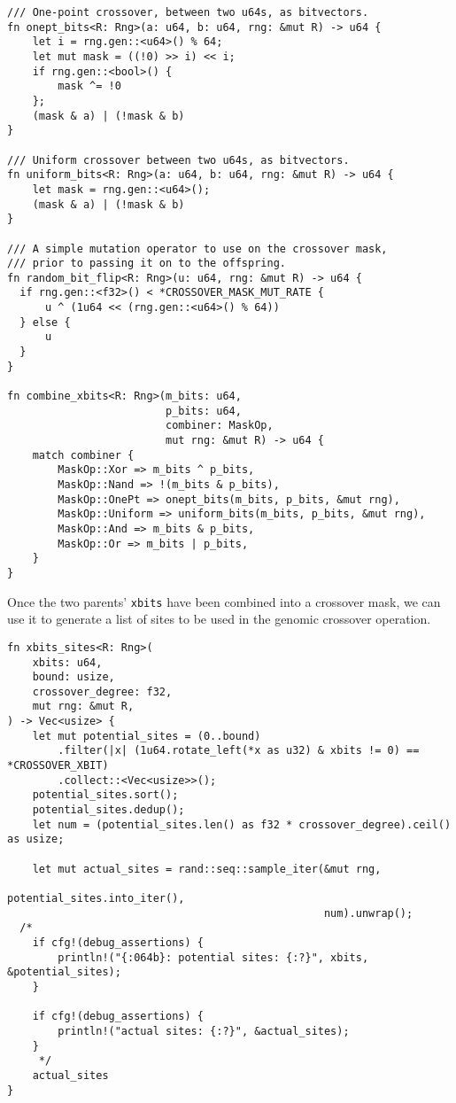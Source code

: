 \documentclass[11pt]{article}
\begin{document}
\lstset{language=rust,label=org20ba1f2,caption= ,captionpos=b,numbers=none}
\begin{lstlisting}
/// One-point crossover, between two u64s, as bitvectors.
fn onept_bits<R: Rng>(a: u64, b: u64, rng: &mut R) -> u64 {
    let i = rng.gen::<u64>() % 64;
    let mut mask = ((!0) >> i) << i;
    if rng.gen::<bool>() {
        mask ^= !0
    };
    (mask & a) | (!mask & b)
}

/// Uniform crossover between two u64s, as bitvectors.
fn uniform_bits<R: Rng>(a: u64, b: u64, rng: &mut R) -> u64 {
    let mask = rng.gen::<u64>();
    (mask & a) | (!mask & b)
}

/// A simple mutation operator to use on the crossover mask,
/// prior to passing it on to the offspring.
fn random_bit_flip<R: Rng>(u: u64, rng: &mut R) -> u64 {
  if rng.gen::<f32>() < *CROSSOVER_MASK_MUT_RATE {
      u ^ (1u64 << (rng.gen::<u64>() % 64)) 
  } else {
      u
  }
}

fn combine_xbits<R: Rng>(m_bits: u64,
                         p_bits: u64,
                         combiner: MaskOp,
                         mut rng: &mut R) -> u64 {
    match combiner {
        MaskOp::Xor => m_bits ^ p_bits,
        MaskOp::Nand => !(m_bits & p_bits),
        MaskOp::OnePt => onept_bits(m_bits, p_bits, &mut rng),
        MaskOp::Uniform => uniform_bits(m_bits, p_bits, &mut rng),
        MaskOp::And => m_bits & p_bits,
        MaskOp::Or => m_bits | p_bits,
    }
}
\end{lstlisting}

Once the two parents' \texttt{xbits} have been combined into a crossover mask, we
can use it to generate a list of sites to be used in the genomic crossover
operation. 

\lstset{language=rust,label=org42d00c5,caption= ,captionpos=b,numbers=none}
\begin{lstlisting}
fn xbits_sites<R: Rng>(
    xbits: u64,
    bound: usize,
    crossover_degree: f32,
    mut rng: &mut R,
) -> Vec<usize> {
    let mut potential_sites = (0..bound)
        .filter(|x| (1u64.rotate_left(*x as u32) & xbits != 0) == *CROSSOVER_XBIT)
        .collect::<Vec<usize>>();
    potential_sites.sort();
    potential_sites.dedup();
    let num = (potential_sites.len() as f32 * crossover_degree).ceil() as usize;

    let mut actual_sites = rand::seq::sample_iter(&mut rng,
                                                  potential_sites.into_iter(), 
                                                  num).unwrap();
  /*
    if cfg!(debug_assertions) {
        println!("{:064b}: potential sites: {:?}", xbits, &potential_sites);
    }

    if cfg!(debug_assertions) {
        println!("actual sites: {:?}", &actual_sites);
    }
     */
    actual_sites
}
\end{lstlisting}
\end{document}
